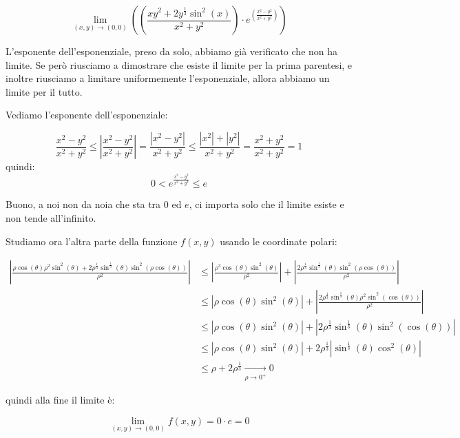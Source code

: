 \[
    \lim_{ (x,y) \to (0,0) } \left( \left( \frac{xy^{2}+2y^{ \frac{1}{3}}\sin^{2}(x)}{x^{2}+y^{2}}\right) \cdot e^{ \left(\frac{x^{2}-y^{2}}{x^{2}+y^{2}}\right)} \right)
\]

L'esponente dell'esponenziale, preso da solo, abbiamo già verificato che non ha limite. Se però riusciamo a dimostrare che esiste il limite per la prima parentesi, e inoltre riusciamo a limitare uniformemente l'esponenziale, allora abbiamo un limite per il tutto.

Vediamo l'esponente dell'esponenziale:

\[
    \frac{x^{2}-y^{2}}{x^{2}+y^{2}} \le \left|\frac{x^{2}-y^{2}}{x^{2}+y^{2}}\right| = \frac{\left|x^{2}-y^{2}\right|}{x^{2}+y^{2}}  \le \frac{\left|x^{2}\right|+\left|y^{2}\right|}{x^{2}+y^{2}} = \frac{x^{2}+y^{2}}{x^{2}+y^{2}} = 1
\]
quindi:
\[
    0 < e ^{ \frac{x^{2}-y^{2}}{x^{2}+y^{2}}} \le e
\]

Buono, a noi non da noia che sta tra \(0\) ed \(e\), ci importa solo che il limite esiste e non tende all'infinito.

Studiamo ora l'altra parte della funzione \(f(x,y)\) usando le coordinate polari:

\begin{align*}
    \left| \frac{\rho\cos(\theta) \rho^{2}\sin^{2}(\theta) + 2 \rho^{\frac{1}{3}}\sin^{\frac{1}{3}}(\theta) \sin^{2}(\rho\cos(\theta))}{\rho^{2}}\right| & \le \left| \frac{\rho^{3}\cos(\theta)\sin^{2}(\theta)}{\rho^{2}}\right| + \left|\frac{2 \rho^{\frac{1}{3}}\sin^{\frac{1}{3}}(\theta) \sin^{2}(\rho\cos(\theta)) }{\rho^{2}}\right| \\
                                                                                                                                                         & \le \left| \rho\cos(\theta) \sin ^{2}(\theta)\right| + \left|\frac{2 \rho^{\frac{1}{3}} \sin^{\frac{1}{3}}(\theta) \rho^2\sin^{2}(\cos(\theta)) }{\rho^{2}}\right|                 \\
                                                                                                                                                         & \le \left| \rho\cos(\theta) \sin ^{2}(\theta)\right| + \left| 2 \rho^{\frac{1}{3}} \sin^{\frac{1}{3}}(\theta) \sin^{2}(\cos(\theta)) \right|                                       \\
                                                                                                                                                         & \le \left| \rho\cos(\theta) \sin ^{2}(\theta)\right| + 2 \rho^{ \frac{1}{3}} \left| \sin^{\frac{1}{3}}(\theta) \cos^{2}(\theta)\right|                                             \\
                                                                                                                                                         & \le \rho + 2 \rho^{ \frac{1}{3}} \xrightarrow[\rho \to 0^+]{} 0
\end{align*}

quindi alla fine il limite è:

\[
    \lim_{ (x,y) \to (0,0) } f(x,y) = 0 \cdot e = 0
\]
